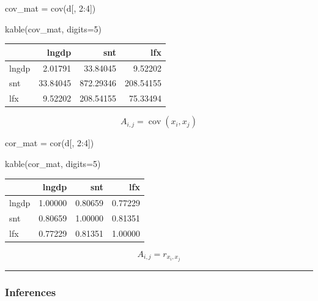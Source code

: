 \documentclass[
]{article}
\newenvironment{Shaded}{}{}
\newcommand{\AttributeTok}[1]{\textcolor[rgb]{0.84,0.60,0.13}{#1}}
\newcommand{\DecValTok}[1]{\textcolor[rgb]{0.96,0.45,0.00}{#1}}
\newcommand{\FunctionTok}[1]{\textcolor[rgb]{0.41,0.62,0.42}{#1}}
\newcommand{\NormalTok}[1]{\textcolor[rgb]{0.24,0.22,0.21}{#1}}
\newcommand{\OtherTok}[1]{\textcolor[rgb]{0.41,0.62,0.42}{#1}}
\newcommand{\SpecialCharTok}[1]{\textcolor[rgb]{0.69,0.38,0.53}{#1}}
\begin{document}
\begin{Shaded}
\begin{Highlighting}[]
\NormalTok{cov\_mat }\OtherTok{=} \FunctionTok{cov}\NormalTok{(d[, }\DecValTok{2}\SpecialCharTok{:}\DecValTok{4}\NormalTok{])}

\FunctionTok{kable}\NormalTok{(cov\_mat, }\AttributeTok{digits=}\DecValTok{5}\NormalTok{)}
\end{Highlighting}
\end{Shaded}

\begin{longtable}[]{@{}lrrr@{}}
\toprule()
& lngdp & snt & lfx \\
\midrule()
\endhead
lngdp & 2.01791 & 33.84045 & 9.52202 \\
snt & 33.84045 & 872.29346 & 208.54155 \\
lfx & 9.52202 & 208.54155 & 75.33494 \\
\bottomrule()
\end{longtable}

\[A_{i,j} = \operatorname{cov}(x_i, x_j)\]

\begin{Shaded}
\begin{Highlighting}[]
\NormalTok{cor\_mat }\OtherTok{=} \FunctionTok{cor}\NormalTok{(d[, }\DecValTok{2}\SpecialCharTok{:}\DecValTok{4}\NormalTok{])}

\FunctionTok{kable}\NormalTok{(cor\_mat, }\AttributeTok{digits=}\DecValTok{5}\NormalTok{)}
\end{Highlighting}
\end{Shaded}

\begin{longtable}[]{@{}lrrr@{}}
\toprule()
& lngdp & snt & lfx \\
\midrule()
\endhead
lngdp & 1.00000 & 0.80659 & 0.77229 \\
snt & 0.80659 & 1.00000 & 0.81351 \\
lfx & 0.77229 & 0.81351 & 1.00000 \\
\bottomrule()
\end{longtable}

\[A_{i,j} = r_{x_i, x_j}\]

\begin{center}\rule{0.5\linewidth}{0.5pt}\end{center}

\hypertarget{inferences-1}{%
\subsubsection{Inferences}\label{inferences-1}}
\end{document}

